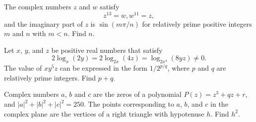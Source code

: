 \begin{question}[name={2012 AIME I, \href{https://artofproblemsolving.com/community/c4p2630386}{Problem 6}}]
	The complex numbers $z$ and $w$ satisfy $$z^{13} = w, w^{11} = z,$$ and the imaginary part of $z$ is $\sin\left({m\pi}/n\right)$ for relatively prime positive integers $m$ and $n$ with $m < n$. Find $n$.
\end{question}


%	












\begin{question}[name={2012 AIME I, \href{https://artofproblemsolving.com/community/c4p2630559}{Problem 9}}]
	Let $x$, $y$, and $z$ be positive real numbers that satisfy\[ 2\log_x(2y) = 2\log_{2x}(4z) = \log_{2x^4}(8yz) \neq 0. \]The value of $xy^5z$ can be expressed in the form ${1}/{2^{p/q}}$, where $p$ and $q$ are relatively prime integers. Find $p+q$.
\end{question}


%	










\begin{question}[name={2012 AIME I, \href{https://artofproblemsolving.com/community/c4p2630575}{Problem 14}}]
	Complex numbers $a$, $b$ and $c$ are the zeros of a polynomial $P(z) = z^3+qz+r$, and $|a|^2+|b|^2+|c|^2=250$. The points corresponding to $a$, $b$, and $c$ in the complex plane are the vertices of a right triangle with hypotenuse $h$. Find $h^2$.
\end{question}


%	














